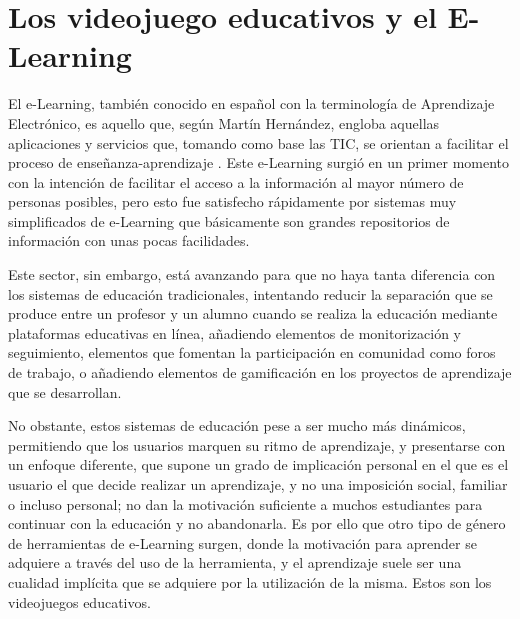 
\section{Los videojuego educativos y el E-Learning}
\label{seriousgames}

El e-Learning, también conocido en español con la terminología de Aprendizaje Electrónico, es aquello que, según Martín Hernández, engloba aquellas aplicaciones y servicios que, tomando como base las TIC, se orientan a facilitar el proceso de enseñanza-aprendizaje \cite{BaeloAlvarez2009}. Este e-Learning surgió en un primer momento con la intención de facilitar el acceso a la información al mayor número de personas posibles, pero esto fue satisfecho rápidamente por sistemas muy simplificados de e-Learning que básicamente son grandes repositorios de información con unas pocas facilidades.

Este sector, sin embargo, está avanzando para que no haya tanta diferencia con los sistemas de educación tradicionales, intentando reducir la separación que se produce entre un profesor y un alumno cuando se realiza la educación mediante plataformas educativas en línea, añadiendo elementos de monitorización y seguimiento, elementos que fomentan la participación en comunidad como foros de trabajo, o añadiendo elementos de gamificación en los proyectos de aprendizaje que se desarrollan.

No obstante, estos sistemas de educación pese a ser mucho más dinámicos, permitiendo que los usuarios marquen su ritmo de aprendizaje, y presentarse con un enfoque diferente, que supone un grado de implicación personal en el que es el usuario el que decide realizar un aprendizaje, y no una imposición social, familiar o incluso personal; no dan la motivación suficiente a muchos estudiantes para continuar con la educación y no abandonarla. Es por ello que otro tipo de género de herramientas de e-Learning surgen, donde la motivación para aprender se adquiere a través del uso de la herramienta, y el aprendizaje suele ser una cualidad implícita que se adquiere por la utilización de la misma. Estos son los videojuegos educativos.

